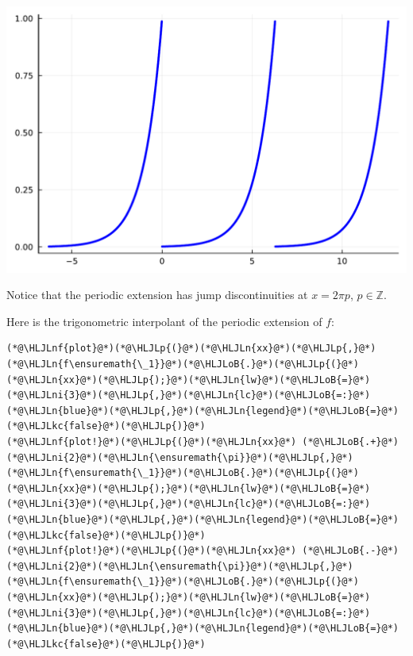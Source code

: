 \documentclass[12pt,landscape]{article}
\newcommand{\HLJLkc}[1]{\textcolor[RGB]{59,151,46}{\textit{#1}}}
\newcommand{\HLJLn}[1]{#1}
\newcommand{\HLJLnf}[1]{\textcolor[RGB]{66,102,213}{#1}}
\newcommand{\HLJLni}[1]{\textcolor[RGB]{59,151,46}{#1}}
\newcommand{\HLJLoB}[1]{\textcolor[RGB]{102,102,102}{\textbf{#1}}}
\newcommand{\HLJLp}[1]{#1}
\begin{document}
{\includegraphics[width=\linewidth]{jl_qsW2Qg/Fourier_22_1.pdf}

Notice that the periodic extension has jump discontinuities at $x = 2\pi p$, $p \in \mathbb{Z}$.

Here is the trigonometric interpolant of the periodic extension of $f$:


\begin{lstlisting}
(*@\HLJLnf{plot}@*)(*@\HLJLp{(}@*)(*@\HLJLn{xx}@*)(*@\HLJLp{,}@*)(*@\HLJLn{f\ensuremath{\_1}}@*)(*@\HLJLoB{.}@*)(*@\HLJLp{(}@*)(*@\HLJLn{xx}@*)(*@\HLJLp{);}@*)(*@\HLJLn{lw}@*)(*@\HLJLoB{=}@*)(*@\HLJLni{3}@*)(*@\HLJLp{,}@*)(*@\HLJLn{lc}@*)(*@\HLJLoB{=:}@*)(*@\HLJLn{blue}@*)(*@\HLJLp{,}@*)(*@\HLJLn{legend}@*)(*@\HLJLoB{=}@*)(*@\HLJLkc{false}@*)(*@\HLJLp{)}@*)
(*@\HLJLnf{plot!}@*)(*@\HLJLp{(}@*)(*@\HLJLn{xx}@*) (*@\HLJLoB{.+}@*) (*@\HLJLni{2}@*)(*@\HLJLn{\ensuremath{\pi}}@*)(*@\HLJLp{,}@*)(*@\HLJLn{f\ensuremath{\_1}}@*)(*@\HLJLoB{.}@*)(*@\HLJLp{(}@*)(*@\HLJLn{xx}@*)(*@\HLJLp{);}@*)(*@\HLJLn{lw}@*)(*@\HLJLoB{=}@*)(*@\HLJLni{3}@*)(*@\HLJLp{,}@*)(*@\HLJLn{lc}@*)(*@\HLJLoB{=:}@*)(*@\HLJLn{blue}@*)(*@\HLJLp{,}@*)(*@\HLJLn{legend}@*)(*@\HLJLoB{=}@*)(*@\HLJLkc{false}@*)(*@\HLJLp{)}@*)
(*@\HLJLnf{plot!}@*)(*@\HLJLp{(}@*)(*@\HLJLn{xx}@*) (*@\HLJLoB{.-}@*) (*@\HLJLni{2}@*)(*@\HLJLn{\ensuremath{\pi}}@*)(*@\HLJLp{,}@*)(*@\HLJLn{f\ensuremath{\_1}}@*)(*@\HLJLoB{.}@*)(*@\HLJLp{(}@*)(*@\HLJLn{xx}@*)(*@\HLJLp{);}@*)(*@\HLJLn{lw}@*)(*@\HLJLoB{=}@*)(*@\HLJLni{3}@*)(*@\HLJLp{,}@*)(*@\HLJLn{lc}@*)(*@\HLJLoB{=:}@*)(*@\HLJLn{blue}@*)(*@\HLJLp{,}@*)(*@\HLJLn{legend}@*)(*@\HLJLoB{=}@*)(*@\HLJLkc{false}@*)(*@\HLJLp{)}@*)


\end{lstlisting}}
\end{document}
